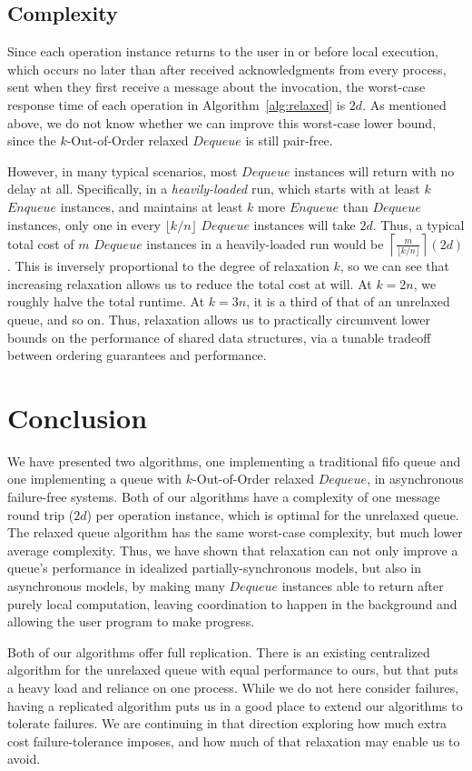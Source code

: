 \documentclass[a4paper,anonymous,USenglish]{lipics-v2021}
\theoremstyle{definition}
\begin{document}
\subsection{Complexity}

Since each operation instance returns to the user in or before local execution, which occurs no later than after received acknowledgments from every process, sent when they first receive a message about the invocation, the worst-case response time of each operation in Algorithm~\ref{alg:relaxed} is $2d$.  As mentioned above, we do not know whether we can improve this worst-case lower bound, since the $k$-Out-of-Order relaxed $Dequeue$ is still pair-free.

However, in many typical scenarios, most $Dequeue$ instances will return with no delay at all.  Specifically, in a \emph{heavily-loaded} run, which starts with at least $k$ $Enqueue$ instances, and maintains at least $k$ more $Enqueue$ than $Dequeue$ instances, only one in every $\lfloor k/n\rfloor$ $Dequeue$ instances will take $2d$.  Thus, a typical total cost of $m$ $Dequeue$ instances in a heavily-loaded run would be $\left\lceil\frac{m}{\lfloor k/n\rfloor}\right\rceil(2d)$.  This is inversely proportional to the degree of relaxation $k$, so we can see that increasing relaxation allows us to reduce the total cost at will.  At $k=2n$, we roughly halve the total runtime.  At $k=3n$, it is a third of that of an unrelaxed queue, and so on.  Thus, relaxation allows us to practically circumvent lower bounds on the performance of shared data structures, via a tunable tradeoff between ordering guarantees and performance.

\section{Conclusion}

We have presented two algorithms, one implementing a traditional fifo queue and one implementing a queue with $k$-Out-of-Order relaxed $Dequeue$, in asynchronous failure-free systems.  Both of our algorithms have a complexity of one message round trip ($2d$) per operation instance, which is optimal for the unrelaxed queue.  The relaxed queue algorithm has the same worst-case complexity, but much lower average complexity.  Thus, we have shown that relaxation can not only improve a queue's performance in idealized partially-synchronous models, but also in asynchronous models, by making many $Dequeue$ instances able to return after purely local computation, leaving coordination to happen in the background and allowing the user program to make progress.

Both of our algorithms offer full replication.  There is an existing centralized algorithm for the unrelaxed queue with equal performance to ours, but that puts a heavy load and reliance on one process.  While we do not here consider failures, having a replicated algorithm puts us in a good place to extend our algorithms to tolerate failures.  We are continuing in that direction exploring how much extra cost failure-tolerance imposes, and how much of that relaxation may enable us to avoid.


\end{document}
